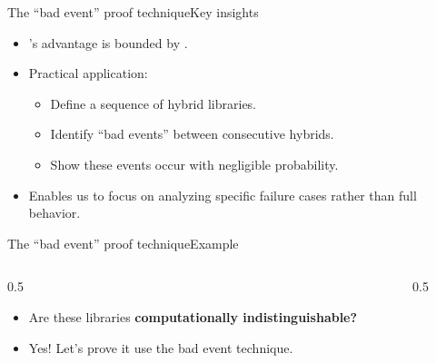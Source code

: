 \documentclass[aspectratio=169, lualatex, handout]{beamer}
\begin{document}
\begin{frame}{The ``bad event'' proof technique}{Key insights}
	\begin{itemize}[<+->]
		\item \prog{}'s advantage is bounded by .
		\item Practical application:
		      \begin{itemize}[<+->]
			      \item Define a sequence of hybrid libraries.
			      \item Identify ``bad events'' between consecutive hybrids.
			      \item Show these events occur with negligible probability.
		      \end{itemize}
		\item Enables us to focus on analyzing specific failure cases rather than full behavior.
	\end{itemize}
\end{frame}

\begin{frame}{The ``bad event'' proof technique}{Example}
	\begin{columns}[c]
		\begin{column}{0.5\textwidth}
			\begin{itemize}[<+->]
				\item Are these libraries \textbf{computationally indistinguishable?}
				\item Yes! Let's prove it use the bad event technique.
			\end{itemize}
		\end{column}
		\begin{column}{0.5\textwidth}
		\end{column}
	\end{columns}
\end{frame}
\end{document}
